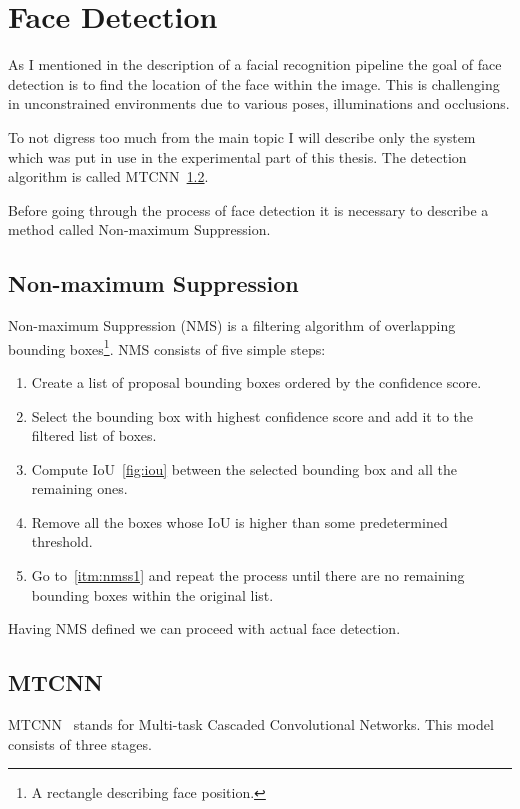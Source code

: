 \section{Face Detection}\label{sec:face-detection}
As I mentioned in the description of a facial recognition pipeline the goal of face detection is to find the location
of the face within the image.
This is challenging in unconstrained environments due to various poses, illuminations and occlusions.

To not digress too much from the main topic I will describe only the system which was put in use in the experimental
part of this thesis.
The detection algorithm is called MTCNN~\ref{subsec:mtcnn}.

Before going through the process of face detection it is necessary to describe a method called Non-maximum Suppression.

\subsection{Non-maximum Suppression}\label{subsec:nms}
Non-maximum Suppression (NMS) is a filtering algorithm of overlapping bounding
boxes\footnote{\label{foot:bbox}A rectangle describing face position.}.
NMS consists of five simple steps:
\begin{enumerate}
    \item \label{itm:nmss1}Create a list of proposal bounding boxes ordered by the confidence score.
    \item Select the bounding box with highest confidence score and add it to the filtered list of boxes.
    \item Compute IoU~\ref{fig:iou} between the selected bounding box and all the remaining ones.
    \item Remove all the boxes whose IoU is higher than some predetermined threshold.
    \item Go to~\ref{itm:nmss1} and repeat the process until there are no remaining bounding boxes within the original list.
\end{enumerate}

Having NMS defined we can proceed with actual face detection.

\subsection{MTCNN}\label{subsec:mtcnn}
MTCNN~\cite{MTCNN} stands for Multi-task Cascaded Convolutional Networks.
This model consists of three stages.

